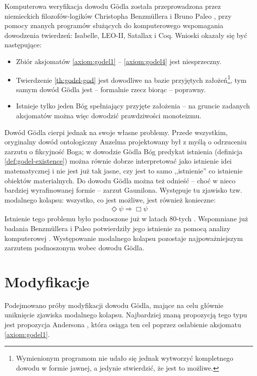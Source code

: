 \documentclass[runningheads]{llncs}
\begin{document}
Komputerowa weryfikacja dowodu G\"odla została przeprowadzona przez niemieckich filozofów-logików Christopha Benzm\"ullera i Bruno Paleo \cite{benzmuller2014}, \cite{benzmuller2016} przy pomocy znanych programów służących do komputerowego wspomagania dowodzenia twierdzeń: Isabelle, LEO-II, Satallax i Coq. Wnioski okazały się być następujące:
\begin{itemize}
	\item Zbiór aksjomatów \ref{axiom:godel1} -- \ref{axiom:godel4} jest niesprzeczny. 
	\item Twierdzenie \ref{th:godel-god} jest dowodliwe na bazie przyjętych założeń\footnote{Wymienionym programom nie udało się jednak wytworzyć kompletnego dowodu w formie jawnej, a jedynie stwierdzić, że jest to możliwe. }, tym samym dowód G\"odla jest -- formalnie rzecz biorąc -- poprawny.
	\item Istnieje tylko jeden Bóg spełniający przyjęte założenia -- na  gruncie zadanych aksjomatów można więc dowodzić prawdziwości monoteizmu. 
\end{itemize}
Dowód G\"odla cierpi jednak na swoje własne problemy. Przede wszystkim, oryginalny dowód ontologiczny Anzelma projektowany był z myślą o odrzuceniu zarzutu o fikcyjność Boga; w dowodzie G\"odla Bóg predykat istnienia (definicja \ref{def:godel-existence}) można równie dobrze interpretować jako istnienie idei matematycznej i nie jest już tak jasne, czy jest to samo ,,istnienie'' co istnienie obiektów materialnych. Do dowodu G\"odla można też odnieść -- choć w nieco bardziej wyrafinowanej formie -- zarzut Gaunilona. Występuje tu zjawisko tzw. modalnego kolapsu: wszystko, co jest możliwe, jest również konieczne:
\begin{align*}
\Diamond \psi \Rightarrow \Box \psi
\end{align*}
Istnienie tego problemu było podnoszone już w latach 80-tych \cite{sobel1987}. Wspomniane już badania Benzm\"ullera i Paleo potwierdziły jego istnienie za pomocą analizy komputerowej \cite{benzmuller2014}. Występowanie modalnego kolapsu pozostaje najpoważniejszym zarzutem podnoszonym wobec dowodu G\"odla. 

\section{Modyfikacje} \label{sec:modyfikacje}

\setcounter{axiom-pl}{0}

Podejmowano próby modyfikacji dowodu G\"odla, mające na celu głównie uniknięcie zjawiska modalnego kolapsu. Najbardziej znaną propozycją tego typu jest propozycja Andersona \cite{anderson1990}, która osiąga ten cel poprzez osłabienie aksjomatu \ref{axiom:godel1}. 
\end{document}
